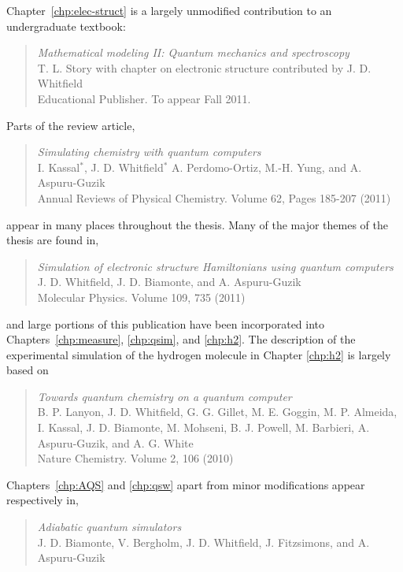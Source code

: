 \begin{citations}


\vspace{0.8in}

\ssp
\noindent
Chapter~\ref{chp:elec-struct} is a largely unmodified contribution to an undergraduate textbook:
\begin{quote}
	\textit{Mathematical modeling II: Quantum mechanics and spectroscopy}\\ T. L. Story 
	with chapter on electronic structure contributed by J. D. Whitfield\\
	Educational Publisher.  To appear Fall 2011.
\end{quote}
Parts of the review article,
\begin{quote}
\textit{Simulating chemistry with quantum computers}\\
I. Kassal$^*$, J. D. Whitfield$^*$ A. Perdomo-Ortiz, M.-H. Yung, and A. Aspuru-Guzik\\
Annual Reviews of Physical Chemistry. Volume 62, Pages 185-207 (2011)
\end{quote}
appear in many places throughout the thesis. Many of the major themes of the thesis are found in,
\begin{quote}
\textit{Simulation of electronic structure Hamiltonians using quantum computers}\\
J. D. Whitfield, J. D. Biamonte, and A. Aspuru-Guzik\\
Molecular Physics. Volume 109, 735 (2011)
\end{quote}
and large portions of this publication have been incorporated into Chapters~\ref{chp:measure}, \ref{chp:qsim}, and \ref{chp:h2}.
The description of the experimental simulation of the hydrogen molecule in Chapter \ref{chp:h2} is largely based on
\begin{quote}
\textit{Towards quantum chemistry on a quantum computer}\\
B. P. Lanyon, J. D. Whitfield, G. G. Gillet, M. E. Goggin, M. P. Almeida, I. Kassal, J. D. Biamonte,
M. Mohseni, B. J. Powell, M. Barbieri, A. Aspuru-Guzik, and A. G. White\\
Nature Chemistry. Volume 2, 106 (2010)
\end{quote}
Chapters~\ref{chp:AQS} and \ref{chp:qsw} apart from minor modifications appear respectively in,
\begin{quote}
\textit{Adiabatic quantum simulators}\\
J. D. Biamonte, V. Bergholm, J. D. Whitfield, J. Fitzsimons, and A. Aspuru-Guzik\\

\end{quote}
\end{citations}
